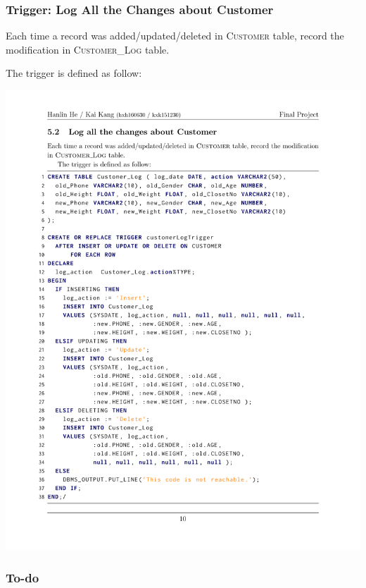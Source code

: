 \documentclass{beamer}
\begin{document}
\begin{frame}
\frametitle{Trigger: Log All the Changes about Customer}
Each time a record was added/updated/deleted in \textsc{Customer} table,
record the modification in \textsc{Customer\_Log} table.

The trigger is defined as follow:

\centering
\includegraphics[height=.7\textheight]{src/customerLogTrigger}
\end{frame}

\begin{frame}
    \frametitle{To-do}
\end{frame}
\end{document}
